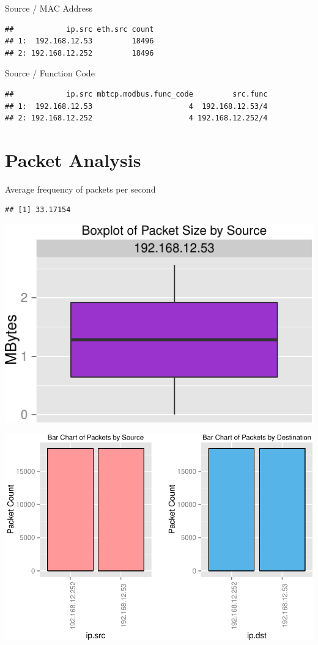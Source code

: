 \documentclass[]{article}
\begin{document}
Source / MAC Address

\begin{verbatim}
##            ip.src eth.src count
## 1:  192.168.12.53         18496
## 2: 192.168.12.252         18496
\end{verbatim}

Source / Function Code

\begin{verbatim}
##            ip.src mbtcp.modbus.func_code         src.func
## 1:  192.168.12.53                      4  192.168.12.53/4
## 2: 192.168.12.252                      4 192.168.12.252/4
\end{verbatim}

\section{Packet Analysis}\label{packet-analysis}

Average frequency of packets per second

\begin{verbatim}
## [1] 33.17154
\end{verbatim}

\begin{center}\includegraphics{sew_files/figure-latex/unnamed-chunk-12-1} \end{center}

\includegraphics{sew_files/figure-latex/unnamed-chunk-13-1.pdf}
\end{document}
